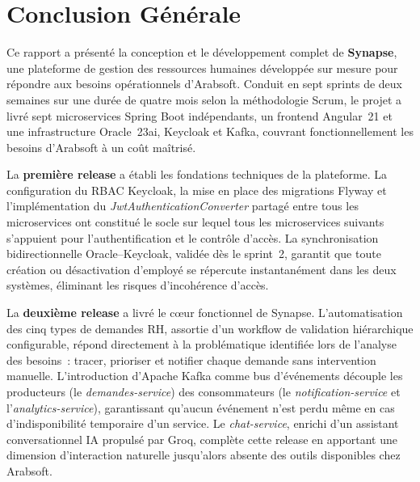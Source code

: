 \documentclass[12pt,a4paper,oneside]{report}
\begin{document}










\chapter*{Conclusion Générale}

Ce rapport a présenté la conception et le développement complet de
\textbf{Synapse}, une plateforme de gestion des ressources humaines développée sur
mesure pour répondre aux besoins opérationnels d'Arabsoft. Conduit en sept sprints
de deux semaines sur une durée de quatre mois selon la méthodologie Scrum,
le projet a livré sept microservices Spring Boot indépendants, un frontend Angular~21
et une infrastructure Oracle~23ai, Keycloak et Kafka, couvrant fonctionnellement
les besoins d'Arabsoft à un coût maîtrisé.

La \textbf{première release} a établi les fondations techniques de la plateforme.
La configuration du RBAC Keycloak, la mise en place des migrations Flyway et
l'implémentation du \textit{JwtAuthenticationConverter} partagé entre tous les
microservices ont constitué le socle sur lequel tous les microservices suivants s'appuient
pour l'authentification et le contrôle d'accès. La synchronisation bidirectionnelle
Oracle--Keycloak, validée dès le sprint~2, garantit que toute création ou
désactivation d'employé se répercute instantanément dans les deux systèmes, éliminant
les risques d'incohérence d'accès.

La \textbf{deuxième release} a livré le cœur fonctionnel de Synapse. L'automatisation
des cinq types de demandes RH, assortie d'un workflow de validation hiérarchique
configurable, répond directement à la problématique identifiée lors de l'analyse des
besoins~: tracer, prioriser et notifier chaque demande sans intervention manuelle.
L'introduction d'Apache Kafka comme bus d'événements découple les producteurs
(le \textit{demandes-service}) des consommateurs (le \textit{notification-service}
et l'\textit{analytics-service}), garantissant qu'aucun événement n'est perdu même
en cas d'indisponibilité temporaire d'un service. Le \textit{chat-service}, enrichi
d'un assistant conversationnel IA propulsé par Groq, complète cette release en
apportant une dimension d'interaction naturelle jusqu'alors absente des outils
disponibles chez Arabsoft.
\end{document}
